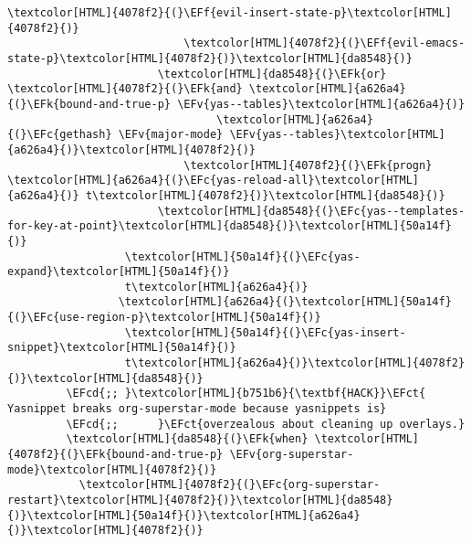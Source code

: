 \documentclass{scrartcl}
\newcommand{\EFk}[1]{\textcolor{EFk}{#1}} %
\newcommand{\EFct}[1]{\textcolor{EFct}{#1}} %
\newcommand{\EFc}[1]{\textcolor{EFc}{#1}} %
\newcommand{\EFv}[1]{\textcolor{EFv}{#1}} %
\newcommand{\EFf}[1]{\textcolor{EFf}{#1}} %
\newcommand{\EFcd}[1]{\textcolor{EFcd}{#1}} %
\begin{document}
\begin{Code}
\begin{Verbatim}[]
                           \textcolor[HTML]{4078f2}{(}\EFf{evil-insert-state-p}\textcolor[HTML]{4078f2}{)}
                           \textcolor[HTML]{4078f2}{(}\EFf{evil-emacs-state-p}\textcolor[HTML]{4078f2}{)}\textcolor[HTML]{da8548}{)}
                       \textcolor[HTML]{da8548}{(}\EFk{or} \textcolor[HTML]{4078f2}{(}\EFk{and} \textcolor[HTML]{a626a4}{(}\EFk{bound-and-true-p} \EFv{yas--tables}\textcolor[HTML]{a626a4}{)}
                                \textcolor[HTML]{a626a4}{(}\EFc{gethash} \EFv{major-mode} \EFv{yas--tables}\textcolor[HTML]{a626a4}{)}\textcolor[HTML]{4078f2}{)}
                           \textcolor[HTML]{4078f2}{(}\EFk{progn} \textcolor[HTML]{a626a4}{(}\EFc{yas-reload-all}\textcolor[HTML]{a626a4}{)} t\textcolor[HTML]{4078f2}{)}\textcolor[HTML]{da8548}{)}
                       \textcolor[HTML]{da8548}{(}\EFc{yas--templates-for-key-at-point}\textcolor[HTML]{da8548}{)}\textcolor[HTML]{50a14f}{)}
                  \textcolor[HTML]{50a14f}{(}\EFc{yas-expand}\textcolor[HTML]{50a14f}{)}
                  t\textcolor[HTML]{a626a4}{)}
                 \textcolor[HTML]{a626a4}{(}\textcolor[HTML]{50a14f}{(}\EFc{use-region-p}\textcolor[HTML]{50a14f}{)}
                  \textcolor[HTML]{50a14f}{(}\EFc{yas-insert-snippet}\textcolor[HTML]{50a14f}{)}
                  t\textcolor[HTML]{a626a4}{)}\textcolor[HTML]{4078f2}{)}\textcolor[HTML]{da8548}{)}
         \EFcd{;; }\textcolor[HTML]{b751b6}{\textbf{HACK}}\EFct{ Yasnippet breaks org-superstar-mode because yasnippets is}
         \EFcd{;;      }\EFct{overzealous about cleaning up overlays.}
         \textcolor[HTML]{da8548}{(}\EFk{when} \textcolor[HTML]{4078f2}{(}\EFk{bound-and-true-p} \EFv{org-superstar-mode}\textcolor[HTML]{4078f2}{)}
           \textcolor[HTML]{4078f2}{(}\EFc{org-superstar-restart}\textcolor[HTML]{4078f2}{)}\textcolor[HTML]{da8548}{)}\textcolor[HTML]{50a14f}{)}\textcolor[HTML]{a626a4}{)}\textcolor[HTML]{4078f2}{)}
\end{Verbatim}
\end{Code}
\end{document}
